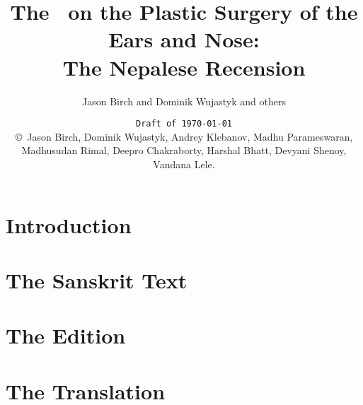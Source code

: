 \documentclass[12pt,draft]{article} %
\title{The \SS\ on the Plastic Surgery of the Ears and Nose:\\ The Nepalese 
Recension}
\author{Jason Birch and Dominik Wujastyk and others}
\date{\texttt{Draft of \today}\\ \copyright\ Jason Birch,
    Dominik Wujastyk,
Andrey Klebanov, 
Madhu Parameswaran,
Madhusudan Rimal, 
Deepro Chakraborty,
Harshal Bhatt, 
Devyani Shenoy,
Vandana Lele.}
\begin{document}
 
    
    
    \pagecolor{cyan}
  
    \maketitle
    \pagecolor{white}
%     
    \tableofcontents
\newpage
    \section{Introduction}
    \section{The Sanskrit Text}
\newpage
    \section{The Edition}
\newpage
    \section{The Translation}
\newpage
%    
    
    
\end{document}
